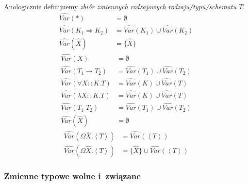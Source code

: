 \documentclass[11pt,leqno]{article}
\begin{document}
\begin{definicja}
Anologicznie definijuemy \emph{zbiór zmiennych rodzajowych rodzaju/typu/schematu $T$}.
\begin{align*}
\widehat{Var}(*) & = \emptyset \\
\widehat{Var}(K_1 \Rightarrow K_2) & = \widehat{Var}(K_1) \cup \widehat{Var}(K_2) \\
\widehat{Var}(\widehat{X}) & = \{ \widehat{X} \}
\end{align*}
\begin{align*}
\widehat{Var}(X) & = \emptyset \\
\widehat{Var}(T_1 \to T_2) & = \widehat{Var}(T_1) \cup \widehat{Var}(T_2) \\
\widehat{Var}(\forall X :: K.T) & = \widehat{Var}(K) \cup \widehat{Var}(T) \\
\widehat{Var}(\lambda X :: K.T) & = \widehat{Var}(K) \cup \widehat{Var}(T) \\
\widehat{Var}(T_1 \; T_2) & = \widehat{Var}(T_1) \cup \widehat{Var}(T_2) \\
\widehat{Var}(\widehat{X}) & = \emptyset
\end{align*}
\begin{align*}
\widehat{Var}(\Omega \bar{X}.\left<T\right>) & = \widehat{Var}(\left<T\right>) \\
\widehat{Var}(\Omega \widehat{X}.\left<T\right>) & = \{ \widehat{X} \} \cup \widehat{Var}(\left<T\right>)
\end{align*}
\end{definicja}

\subsubsection{Zmienne typowe wolne i~związane}
\end{document}
